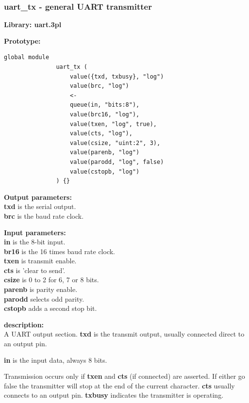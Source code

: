         \subsubsection{uart\_tx - general UART transmitter}\label{sec:lmuarttx}

            {\bf Library: uart.3pl}

            {\bf Prototype:} \\
            \vsp
            \begin{lstlisting}[gobble=12, language=threepl]
               global module
               uart_tx (
                   value({txd, txbusy}, "log")
                   value(brc, "log")
                   <-
                   queue(in, "bits:8"),
                   value(brc16, "log"),
                   value(txen, "log", true),
                   value(cts, "log"),
                   value(csize, "uint:2", 3),
                   value(parenb, "log")
                   value(parodd, "log", false)
                   value(cstopb, "log")
               ) {}
            \end{lstlisting}

            {\bf Output parameters:} \\
            {\bf txd} is the serial output.\\
            {\bf brc} is the baud rate clock.

            {\bf Input parameters:} \\
            {\bf in} is the 8-bit input.\\
            {\bf br16} is the 16 times baud rate clock.\\
            {\bf txen} is transmit enable.\\
            {\bf cts} is 'clear to send'.\\
            {\bf csize} is 0 to 2 for 6, 7 or 8 bits.\\
            {\bf parenb} is parity enable.\\
            {\bf parodd} selects odd parity.\\
            {\bf cstopb} adds a second stop bit.

            {\bf description:} \\
            A UART output section. {\bf txd} is the transmit output, usually
            connected direct to an output pin.

            {\bf in} is the input data, always 8 bits.

            Transmission occurs only if {\bf txen} and {\bf cts} (if connected)
            are asserted. If either go false the transmitter will stop at the
            end of the current character. {\bf cts} usually connects to an
            output pin. {\bf txbusy} indicates the transmitter is operating.

